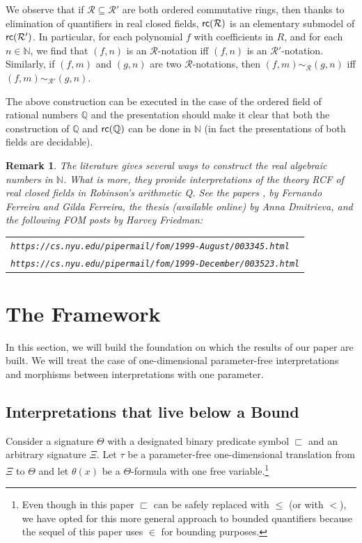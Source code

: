 \documentclass{amsart}
\renewcommand{\leq}{\leqslant}
\renewcommand{\Theta}{\varTheta}
\renewcommand{\Xi}{\varXi}
\newtheorem{rem}[theorem]{Remark}
\newcommand{\mc}[1]{\mathcal #1}
\newcommand{\belowz}{\sqsubset}
\newcommand{\rc}{{\sf rc}}
\begin{document}
We observe that if $\mc R\subseteq \mc R'$ are both ordered commutative rings, then thanks to elimination of quantifiers in real closed fields, $\rc(\mc R)$ is an elementary submodel of $\rc(\mc R')$. In particular,
for each polynomial $f$ with coefficients in $R$, and for each $n\in\mathbb{N}$,
we find that $(f,n)$ is an $\mc R$-notation iff $(f,n)$ is an $\mc R'$-notation. 
Similarly, if $(f,m)$ and $(g,n)$ are two $\mc R$-notations, 
then $(f,m)\sim_{\mc R}(g,n)$ iff $(f,m)\sim_\mathsf{\mc R'}(g,n)$.

The above construction can be executed in the case of the ordered field of rational numbers $\mathbb{Q}$ and the presentation should make it clear that both the construction of $\mathbb{Q}$ and ${\sf rc}(\mathbb{Q})$ can be done in $\mathbb{N}$ (in fact the presentations of both fields are decidable).

\begin{rem}
The literature gives several ways to construct the real algebraic numbers in $\mathbb N$. What is more, they provide interpretations
of the theory {\sf RCF} of real closed fields in Robinson's arithmetic {\sf Q}. See the papers \cite{fern:groun22}, \cite{ferr:inte13} by Fernando Ferreira and Gilda Ferreira, the thesis \cite{dimi:firs19} (available online) by Anna Dmitrieva, and the following FOM posts by Harvey Friedman:\\
\begin{tabular}{l}
 {\tt https://cs.nyu.edu/pipermail/fom/1999-August/003345.html}\\
   {\tt https://cs.nyu.edu/pipermail/fom/1999-December/003523.html}
   \end{tabular}
\end{rem}

\section{The Framework}\label{smurfdebouwer}
In this section, we will build the foundation on which the results of our paper are built.
We will treat the case of one-dimensional parameter-free interpretations and morphisms between
interpretations with one parameter. 

\subsection{Interpretations that live below a Bound}
Consider a signature $\Theta$ with a designated binary predicate symbol $\belowz$ and an arbitrary signature $\Xi$.
Let $\tau$ be a parameter-free one-dimensional translation from $\Xi$ to $\Theta$ and
let $\theta(x)$ be a $\Theta$-formula with one free variable.\footnote{Even though in this paper $\belowz$ can be safely replaced with $\leq$ (or with $<$), we have opted for this more general approach to bounded quantifiers because the sequel of this paper uses $\in$ for bounding purposes.} 
\end{document}
